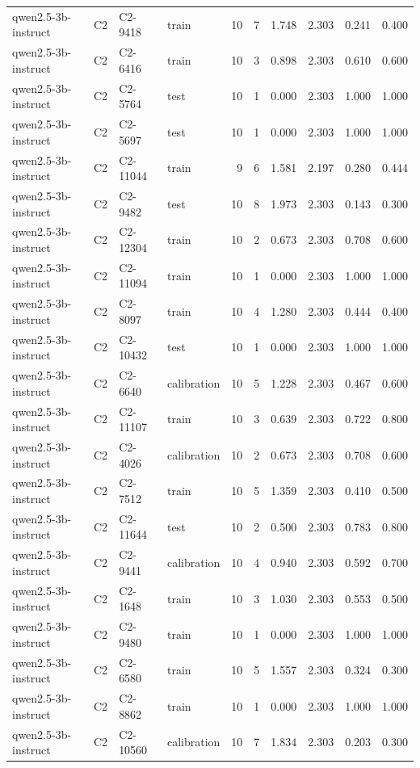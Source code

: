 \begin{table}
\begin{tabular}{llllrrrrrr}
qwen2.5-3b-instruct & C2 & C2-9418 & train & 10 & 7 & 1.748 & 2.303 & 0.241 & 0.400 \\
qwen2.5-3b-instruct & C2 & C2-6416 & train & 10 & 3 & 0.898 & 2.303 & 0.610 & 0.600 \\
qwen2.5-3b-instruct & C2 & C2-5764 & test & 10 & 1 & 0.000 & 2.303 & 1.000 & 1.000 \\
qwen2.5-3b-instruct & C2 & C2-5697 & test & 10 & 1 & 0.000 & 2.303 & 1.000 & 1.000 \\
qwen2.5-3b-instruct & C2 & C2-11044 & train & 9 & 6 & 1.581 & 2.197 & 0.280 & 0.444 \\
qwen2.5-3b-instruct & C2 & C2-9482 & test & 10 & 8 & 1.973 & 2.303 & 0.143 & 0.300 \\
qwen2.5-3b-instruct & C2 & C2-12304 & train & 10 & 2 & 0.673 & 2.303 & 0.708 & 0.600 \\
qwen2.5-3b-instruct & C2 & C2-11094 & train & 10 & 1 & 0.000 & 2.303 & 1.000 & 1.000 \\
qwen2.5-3b-instruct & C2 & C2-8097 & train & 10 & 4 & 1.280 & 2.303 & 0.444 & 0.400 \\
qwen2.5-3b-instruct & C2 & C2-10432 & test & 10 & 1 & 0.000 & 2.303 & 1.000 & 1.000 \\
qwen2.5-3b-instruct & C2 & C2-6640 & calibration & 10 & 5 & 1.228 & 2.303 & 0.467 & 0.600 \\
qwen2.5-3b-instruct & C2 & C2-11107 & train & 10 & 3 & 0.639 & 2.303 & 0.722 & 0.800 \\
qwen2.5-3b-instruct & C2 & C2-4026 & calibration & 10 & 2 & 0.673 & 2.303 & 0.708 & 0.600 \\
qwen2.5-3b-instruct & C2 & C2-7512 & train & 10 & 5 & 1.359 & 2.303 & 0.410 & 0.500 \\
qwen2.5-3b-instruct & C2 & C2-11644 & test & 10 & 2 & 0.500 & 2.303 & 0.783 & 0.800 \\
qwen2.5-3b-instruct & C2 & C2-9441 & calibration & 10 & 4 & 0.940 & 2.303 & 0.592 & 0.700 \\
qwen2.5-3b-instruct & C2 & C2-1648 & train & 10 & 3 & 1.030 & 2.303 & 0.553 & 0.500 \\
qwen2.5-3b-instruct & C2 & C2-9480 & train & 10 & 1 & 0.000 & 2.303 & 1.000 & 1.000 \\
qwen2.5-3b-instruct & C2 & C2-6580 & train & 10 & 5 & 1.557 & 2.303 & 0.324 & 0.300 \\
qwen2.5-3b-instruct & C2 & C2-8862 & train & 10 & 1 & 0.000 & 2.303 & 1.000 & 1.000 \\
qwen2.5-3b-instruct & C2 & C2-10560 & calibration & 10 & 7 & 1.834 & 2.303 & 0.203 & 0.300 \\

\end{tabular}
\end{table}
